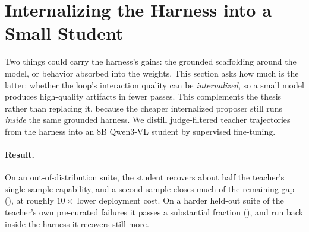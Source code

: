 \section{Internalizing the Harness into a Small Student}
\label{sec:distill}

Two things could carry the harness's gains: the grounded scaffolding around the model, or behavior absorbed into the weights. This section asks how much is the latter: whether the loop's interaction quality can be \emph{internalized}, so a small model produces high-quality artifacts in fewer passes. This complements the thesis rather than replacing it, because the cheaper internalized proposer still runs \emph{inside} the same grounded harness. We distill judge-filtered teacher trajectories from the harness into an $8$B Qwen3-VL student by supervised fine-tuning.

\paragraph{Result.} On an out-of-distribution suite, the student recovers about half the teacher's single-sample capability, and a second sample closes much of the remaining gap (), at roughly $10\times$ lower deployment cost. On a harder held-out suite of the teacher's own pre-curated failures it passes a substantial fraction (), and run back inside the harness it recovers still more.

